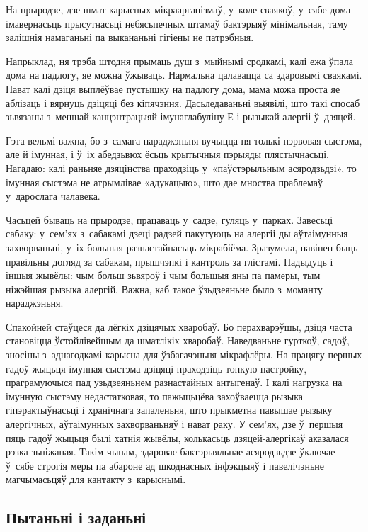 На прыродзе, дзе шмат карысных мікраарганізмаў, у~коле сваякоў, у~сябе дома імавернасьць прысутнасьці небясьпечных штамаў бактэрыяў мінімальная, таму залішнія намаганьні па выкананьні гігіены не патрэбныя.

Напрыклад, ня трэба штодня прымаць душ з~мыйнымі сродкамі, калі ежа ўпала дома на падлогу, яе можна ўжываць. Нармальна цалавацца са здаровымі сваякамі. Нават калі дзіця выплёўвае пустышку на падлогу дома, мама можа проста яе аблізаць і вярнуць дзіцяці без кіпячэння. Дасьледаваньні выявілі, што такі спосаб зьвязаны з~меншай канцэнтрацыяй імунаглабуліну Е і рызыкай алергіі ў~дзяцей.

Гэта вельмі важна, бо з~самага нараджэньня вучыцца ня толькі нэрвовая сыстэма, але й імунная, і ў~іх абедзьвюх ёсьць крытычныя пэрыяды плястычнасьці. Нагадаю: калі раньняе дзяцінства праходзіць у~«паўстэрыльным асяродзьдзі», то імунная сыстэма не атрымлівае «адукацыю», што дае мноства праблемаў у~дарослага чалавека.

Часьцей бываць на прыродзе, працаваць у~садзе, гуляць у~парках. Завесьці сабаку: у~сем'ях з~сабакамі дзеці радзей пакутуюць на алергіі ды аўтаімунныя захворваньні, у~іх большая разнастайнасьць мікрабіёма. Зразумела, павінен быць правільны догляд за сабакам, прышчэпкі і кантроль за глістамі. Падыдуць і іншыя жывёлы: чым больш зьвяроў і чым большыя яны па памеры, тым ніжэйшая рызыка алергій. Важна, каб такое ўзьдзеяньне было з~моманту нараджэньня. 

Спакойней стаўцеся да лёгкіх дзіцячых хваробаў. Бо перахварэўшы, дзіця часта становіцца ўстойлівейшым да шматлікіх хваробаў. Наведваньне гурткоў, садоў, зносіны з~аднагодкамі карысна для ўзбагачэньня мікрафлёры. На працягу першых гадоў жыцьця імунная сыстэма дзіцяці праходзіць тонкую настройку, праграмуючыся пад узьдзеяньнем разнастайных антыгенаў. І калі нагрузка на імунную сыстэму недастатковая, то пажыцьцёва захоўваецца рызыка гіпэрактыўнасьці і хранічнага запаленьня, што прыкметна павышае рызыку алергічных, аўтаімунных захворваньняў і нават раку. У сем'ях, дзе ў~першыя пяць гадоў жыцьця былі хатнія жывёлы, колькасьць дзяцей-алергікаў аказалася рэзка зьніжаная. Такім чынам, здаровае бактэрыяльнае асяродзьдзе ўключае ў~сябе строгія меры па абароне ад шкоднасных інфэкцыяў і павелічэньне магчымасьцяў для кантакту з~карыснымі.

\subsection*{Пытаньні і заданьні}

